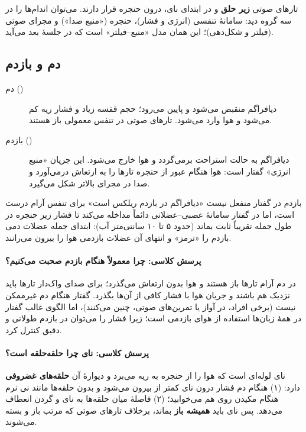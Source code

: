 تارهای صوتی \textbf{زیر حلق} و در ابتدای نای، درون حنجره قرار دارند. می‌توان اندام‌ها را در سه گروه دید: سامانهٔ تنفسی (انرژی و فشار)، حنجره («منبع صدا») و مجرای صوتی (فیلتر و شکل‌دهی)؛ این همان مدل «منبع–فیلتر» است که در جلسهٔ بعد می‌آید.

\subsection{دم و بازدم}
\begin{description}
  \item[دم ()] دیافراگم منقبض می‌شود و پایین می‌رود؛ حجم قفسه زیاد و فشار ریه کم می‌شود و هوا وارد می‌شود. تارهای صوتی در تنفس معمولی باز هستند.
  \item[بازدم ()] دیافراگم به حالت استراحت برمی‌گردد و هوا خارج می‌شود. این جریان «منبع انرژی» گفتار است: هوا هنگام عبور از حنجره تارها را به ارتعاش درمی‌آورد و صدا در مجرای بالاتر شکل می‌گیرد.
\end{description}

\begin{correctionbox}{بازدم در گفتار منفعل نیست}
«دیافراگم در بازدم ریلکس است» برای تنفس آرام درست است، اما در گفتار سامانهٔ عصبی–عضلانی دائماً مداخله می‌کند تا فشار زیر حنجره در طول جمله تقریباً ثابت بماند (حدود ۵ تا ۱۰ سانتی‌متر آب): ابتدای جمله عضلات دمی بازدم را «ترمز» و انتهای آن عضلات بازدمی هوا را بیرون می‌رانند.
\end{correctionbox}

\paragraph{پرسش کلاسی: چرا معمولاً هنگام بازدم صحبت می‌کنیم؟} در دم آرام تارها باز هستند و هوا بدون ارتعاش می‌گذرد؛ برای صدای واک‌دار تارها باید نزدیک هم باشند و جریان هوا با فشار کافی از آن‌ها بگذرد. گفتار هنگام دم غیرممکن نیست (برخی افراد، در آواز یا تمرین‌های صوتی، چنین می‌کنند)، اما الگوی غالب گفتار در همهٔ زبان‌ها استفاده از هوای بازدمی است؛ زیرا فشار را می‌توان در بازدم طولانی و دقیق کنترل کرد.

\paragraph{پرسش کلاسی: نای چرا حلقه‌حلقه است؟} نای لوله‌ای است که هوا را از حنجره به ریه می‌برد و دیوارهٔ آن \textbf{حلقه‌های غضروفی} دارد: (۱) هنگام دم فشار درون نای کمتر از بیرون می‌شود و بدون حلقه‌ها مانند نی نرم هنگام مکیدن روی هم می‌خوابید؛ (۲) فاصلهٔ میان حلقه‌ها به نای و گردن انعطاف می‌دهد. پس نای باید \textbf{همیشه باز} بماند، برخلاف تارهای صوتی که مرتب باز و بسته می‌شوند.

